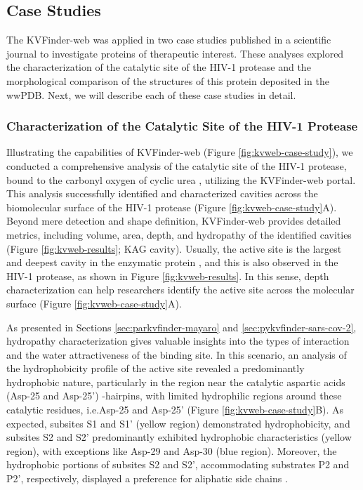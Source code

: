 \documentclass[Ingles]{phdthesis}
\def\ie{i.e.\onedot}
\begin{document}
\subsection{Case Studies}

The KVFinder-web was applied in two case studies published in a scientific journal to investigate proteins of therapeutic interest. These analyses explored the characterization of the catalytic site of the \acs{HIV-1} protease and the morphological comparison of the structures of this protein deposited in the \acs{wwPDB}. Next, we will describe each of these case studies in detail.

\subsubsection{Characterization of the Catalytic Site of the HIV-1 Protease}

Illustrating the capabilities of KVFinder-web (Figure \ref{fig:kvweb-case-study}), we conducted a comprehensive analysis of the catalytic site of the \acs{HIV-1} protease, bound to the carbonyl oxygen of cyclic urea \cite{lam1994}, utilizing the KVFinder-web portal. This analysis successfully identified and characterized cavities across the biomolecular surface of the \acs{HIV-1} protease (Figure \ref{fig:kvweb-case-study}A). Beyond mere detection and shape definition, KVFinder-web provides detailed metrics, including volume, area, depth, and hydropathy of the identified cavities (Figure \ref{fig:kvweb-results}; KAG cavity). Usually, the active site is the largest and deepest cavity in the enzymatic protein \cite{laskowski1996}, and this is also observed in the \acs{HIV-1} protease, as shown in Figure \ref{fig:kvweb-results}. In this sense, depth characterization can help researchers identify the active site across the molecular surface (Figure \ref{fig:kvweb-case-study}A).

As presented in Sections \ref{sec:parkvfinder-mayaro} and \ref{sec:pykvfinder-sars-cov-2}, hydropathy characterization gives valuable insights into the types of interaction and the water attractiveness of the binding site. In this scenario, an analysis of the hydrophobicity profile of the active site revealed a predominantly hydrophobic nature, particularly in the region near the catalytic aspartic acids (Asp-25 and Asp-25') \textbeta-hairpins, with limited hydrophilic regions around these catalytic residues, \ie Asp-25 and Asp-25' (Figure \ref{fig:kvweb-case-study}B). As expected, subsites S1 and S1' (yellow region) demonstrated hydrophobicity, and subsites S2 and S2' predominantly exhibited hydrophobic characteristics (yellow region), with exceptions like Asp-29 and Asp-30 (blue region). Moreover, the hydrophobic portions of subsites S2 and S2', accommodating substrates P2 and P2', respectively, displayed a preference for aliphatic side chains \cite{lam1994,brik2002,weber2009}.
\end{document}
